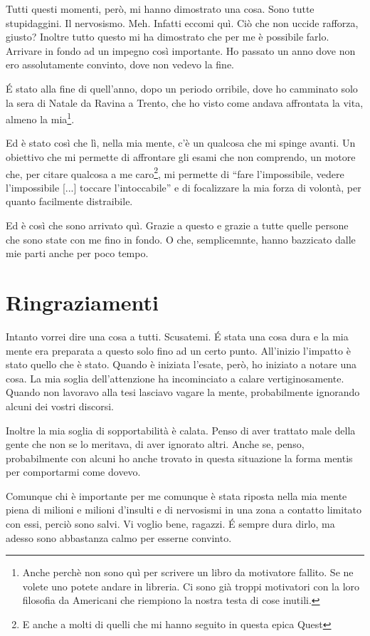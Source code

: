 Tutti questi momenti, però, mi hanno dimostrato una cosa. Sono tutte
stupidaggini. Il nervosismo. Meh. Infatti eccomi quì. Ciò che non uccide
rafforza, giusto? Inoltre tutto questo mi ha dimostrato che per me è
possibile farlo. Arrivare in fondo ad un impegno così importante. Ho
passato un anno dove non ero assolutamente convinto, dove non vedevo la
fine.

\'E stato alla fine di quell'anno, dopo un periodo orribile, dove ho
camminato solo la sera di Natale da Ravina a Trento, che ho visto come
andava affrontata la vita, almeno la mia\footnote{Anche perchè non sono quì
per scrivere un libro da motivatore fallito. Se ne volete uno potete andare
in libreria. Ci sono già troppi motivatori con la loro filosofia da
Americani che riempiono la nostra testa di cose inutili.}.

Ed è stato così che lì, nella mia mente, c'è un qualcosa che mi spinge
avanti. Un obiettivo che mi permette di affrontare gli esami che non
comprendo, un motore che, per citare qualcosa a me caro\footnote{E anche a
molti di quelli che mi hanno seguito in questa epica Quest}, mi permette di
``fare l'impossibile, vedere l'impossibile [...] toccare l'intoccabile'' e
di focalizzare la mia forza di volontà, per quanto facilmente distraibile.

Ed è così che sono arrivato quì. Grazie a questo e grazie a tutte quelle
persone che sono state con me fino in fondo. O che, semplicemnte, hanno
bazzicato dalle mie parti anche per poco tempo.

\section*{Ringraziamenti}
Intanto vorrei dire una cosa a tutti. Scusatemi. \'E stata una cosa dura e
la mia mente era preparata a questo solo fino ad un certo punto. All'inizio
l'impatto è stato quello che è stato. Quando è iniziata l'esate, però, ho
iniziato a notare una cosa. La mia soglia dell'attenzione ha incominciato a
calare vertiginosamente. Quando non lavoravo alla tesi lasciavo vagare la
mente, probabilmente ignorando alcuni dei vostri discorsi.

Inoltre la mia soglia di sopportabilità è calata. Penso di aver trattato
male della gente che non se lo meritava, di aver ignorato altri. Anche se,
penso, probabilmente con alcuni ho anche trovato in questa situazione la
forma mentis per comportarmi come dovevo.

Comunque chi è importante per me comunque è stata riposta nella mia mente
piena di milioni e milioni d'insulti e di nervosismi in una zona a contatto
limitato con essi, perciò sono salvi. Vi voglio bene, ragazzi. \'E sempre
dura dirlo, ma adesso sono abbastanza calmo per esserne convinto.

